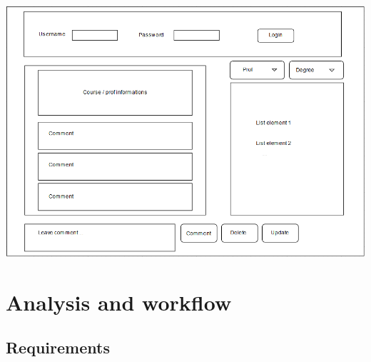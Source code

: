 \documentclass[a4paper]{article}
\begin{document}
\begin{minipage}{\linewidth}
\begin{center}
\vspace{8mm}
\includegraphics[width=\textwidth]{./images/diagrams/Mockup.pdf} 
\vspace{3mm}
\label{fig:mockup}
\end{center}
\end{minipage}

\clearpage

\section{Analysis and workflow}

\subsection{Requirements}
\end{document}
